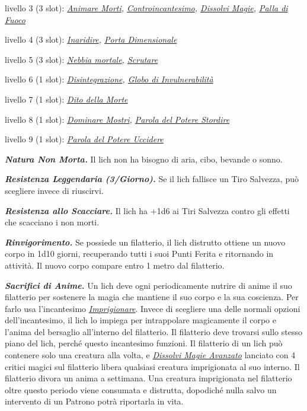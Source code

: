 \begin{multicols}{2}
{livello 3 (3 slot): \emph{\hyperlink{Animare Morti}{Animare Morti}, \hyperlink{Controincantesimo}{Controincantesimo}, \hyperlink{Dissolvi Magie}{Dissolvi Magie}, \hyperlink{Palla di Fuoco}{Palla di Fuoco}}

livello 4 (3 slot): \emph{\hyperlink{Inaridire}{Inaridire}, \hyperlink{Porta Dimensionale}{Porta Dimensionale}}

livello 5 (3 slot): \emph{\hyperlink{Nebbia mortale}{Nebbia mortale}, \hyperlink{Scrutare}{Scrutare}}

livello 6 (1 slot): \emph{\hyperlink{Disintegrazione}{Disintegrazione}, \hyperlink{Globo di Invulnerabilità}{Globo di Invulnerabilità}}

livello 7 (1 slot): \emph{\hyperlink{Dito della Morte}{Dito della Morte}}

livello 8 (1 slot): \emph{\hyperlink{Dominare Mostri}{Dominare Mostri}, \hyperlink{Parola del Potere Stordire}{Parola del Potere Stordire}}

livello 9 (1 slot): \emph{\hyperlink{Parola del Potere Uccidere}{Parola del Potere Uccidere}}

\emph{\textbf{Natura Non Morta.}} Il lich non ha bisogno di aria, cibo, bevande o sonno.

\emph{\textbf{Resistenza Leggendaria (3/Giorno).}} Se il lich fallisce un Tiro Salvezza, può scegliere invece di riuscirvi.

\emph{\textbf{Resistenza allo Scacciare.}} Il lich ha +1d6 ai Tiri Salvezza contro gli effetti che scacciano i non morti.

\emph{\textbf{Rinvigorimento.}} Se possiede un filatterio, il lich distrutto ottiene un nuovo corpo in 1d10 giorni, recuperando tutti i suoi Punti Ferita e ritornando in attività. Il nuovo corpo compare entro 1 metro dal filatterio.

\emph{\textbf{Sacrifici di Anime.}} Un lich deve ogni periodicamente nutrire di anime il suo filatterio per sostenere la magia che mantiene il suo corpo e la sua coscienza. Per farlo usa l'incantesimo \emph{\hyperlink{Imprigionare}{Imprigionare}}. Invece di scegliere una delle normali opzioni dell'incantesimo, il lich lo impiega per intrappolare magicamente il corpo e l'anima del bersaglio all'interno del filatterio. Il filatterio deve trovarsi sullo stesso piano del lich, perché questo incantesimo funzioni. Il filatterio di un lich può contenere solo una creatura alla volta, e \emph{\hyperlink{Dissolvi Magie Avanzato}{Dissolvi Magie Avanzato}} lanciato con 4 critici magici sul filatterio libera qualsiasi creatura imprigionata al suo interno. Il filatterio divora un anima a settimana. Una creatura imprigionata nel filatterio oltre questo periodo viene consumata e distrutta, dopodiché nulla salvo un intervento di un Patrono potrà riportarla in vita.

}
\end{multicols}
